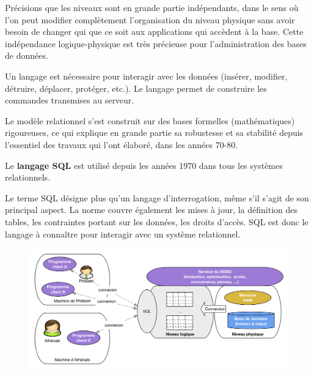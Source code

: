 \documentclass[
  letterpaper,
  DIV=11,
  numbers=noendperiod]{scrartcl}
\begin{document}
Précisions que les niveaux sont en grande partie indépendants, dans le
sens où l'on peut modifier complètement l'organisation du niveau
physique sans avoir besoin de changer qui que ce soit aux applications
qui accèdent à la base. Cette indépendance logique-physique est très
précieuse pour l'administration des bases de données.

Un langage est nécessaire pour interagir avec les données (insérer,
modifier, détruire, déplacer, protéger, etc.). Le langage permet de
construire les commandes transmises au serveur.

Le modèle relationnel s'est construit sur des bases formelles
(mathématiques) rigoureuses, ce qui explique en grande partie sa
robustesse et sa stabilité depuis l'essentiel des travaux qui l'ont
élaboré, dans les années 70-80.

Le \textbf{langage SQL} est utilisé depuis les années 1970 dans tous les
systèmes relationnels.

Le terme SQL désigne plus qu'un langage d'interrogation, même s'il
s'agit de son principal aspect. La norme couvre également les mises à
jour, la définition des tables, les contraintes portant sur les données,
les droits d'accès. SQL est donc le langage à connaître pour interagir
avec un système relationnel.

\begin{figure}

{\centering \includegraphics{BDD4.png}

}

\end{figure}
\end{document}
